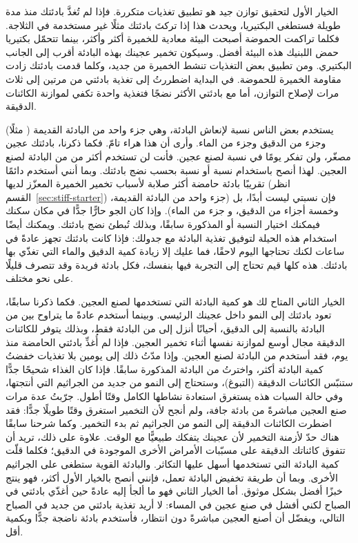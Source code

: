 الخيار الأول لتحقيق توازن جيد هو تطبيق تغذيات متكررة. فإذا لم تُغذَّ بادئتك منذ مدة طويلة فستطغى البكتيريا، ويحدث هذا إذا تركتَ بادئتك مثلًا غير مستخدمة في الثلاجة. فكلما تراكمت الحموضة أصبحت البيئة معادية للخميرة أكثر وأكثر، بينما تتحمّل بكتيريا حمض اللبنيك هذه البيئة أفضل. وسيكون تخمير عجينك بهذه البادئة أقرب إلى الجانب البكتيري. ومن تطبيق بعض التغذيات تنشط الخميرة من جديد، وكلما قدمت بادئتك زادت مقاومة الخميرة للحموضة. في البداية اضطررتُ إلى تغذية بادئتي من مرتين إلى ثلاث مرات  لإصلاح التوازن، أما مع بادئتي الأكثر نضجًا فتغذية واحدة تكفي لموازنة الكائنات الدقيقة.

يستخدم بعض الناس نسبة  لإنعاش البادئة، وهي جزء واحد من البادئة القديمة ( مثلًا) وجزء من الدقيق وجزء من الماء. وأرى أن هذا هراء تامّ. فكما ذكرنا، بادئتك عجين مصغّر، ولن تفكر يومًا في نسبة  لصنع عجين. فأنت لن تستخدم أكثر من  من البادئة لصنع العجين. لهذا أنصح باستخدام نسبة  أو نسبة  بحسب نضج بادئتك. وبما أنني أستخدم دائمًا تقريبًا بادئة حامضة أكثر صلابة لأسباب تخمير الخميرة المعزّز لديها (انظر القسم~\ref{sec:stiff-starter}) فإن نسبتي ليست  أبدًا، بل  (جزء واحد من البادئة القديمة، وخمسة أجزاء من الدقيق، و جزء من الماء). وإذا كان الجو حارًّا جدًّا في مكان سكنك فيمكنك اختيار النسبة  أو  المذكورة سابقًا، وبذلك تُبطئ نضج بادئتك. ويمكنك أيضًا استخدام هذه الحيلة لتوفيق تغذية البادئة مع جدولك: فإذا كانت بادئتك تجهز عادةً في  ساعات لكنك تحتاجها اليوم لاحقًا، فما عليك إلا زيادة كمية الدقيق والماء التي تغذّي بها بادئتك. هذه كلها قيم تحتاج إلى التجربة فيها بنفسك، فكل بادئة فريدة وقد تتصرف قليلًا على نحو مختلف.

الخيار الثاني المتاح لك هو كمية البادئة التي تستخدمها لصنع العجين. فكما ذكرنا سابقًا، تعود بادئتك إلى النمو داخل عجينك الرئيسي. وبينما أستخدم عادةً ما يتراوح بين  من البادئة بالنسبة إلى الدقيق، أحيانًا أنزل إلى  من البادئة فقط، وبذلك يتوفر للكائنات الدقيقة مجال أوسع لموازنة نفسها أثناء تخمير العجين. فإذا لم أُغذِّ بادئتي الحامضة منذ يوم، فقد أستخدم  من البادئة لصنع العجين. وإذا مدّتُ ذلك إلى يومين بلا تغذيات خفضتُ كمية البادئة أكثر، واخترتُ  من البادئة المذكورة سابقًا. فإذا كان الغذاء شحيحًا جدًّا ستنبّس الكائنات الدقيقة (التبوغ)، وستحتاج إلى النمو من جديد من الجراثيم التي أنتجتها، وفي حالة السبات هذه يستغرق استعادة نشاطها الكامل وقتًا أطول. جرّبتُ عدة مرات صنع العجين مباشرةً من بادئة جافة، ولم أنجح لأن التخمير استغرق وقتًا طويلًا جدًّا: فقد اضطرت الكائنات الدقيقة إلى النمو من الجراثيم ثم بدء التخمير. وكما شرحنا سابقًا هناك حدّ لأزمنة التخمير لأن عجينك يتفكك طبيعيًّا مع الوقت. علاوة على ذلك، تريد أن تتفوق كائناتك الدقيقة على مسبّبات الأمراض الأخرى الموجودة في الدقيق؛ فكلما قلّت كمية البادئة التي تستخدمها أسهل عليها التكاثر. والبادئة القوية ستطغى على الجراثيم الأخرى. وبما أن طريقة تخفيض البادئة تعمل، فإنني أنصح بالخيار الأول أكثر، فهو ينتج خبزًا أفضل بشكل موثوق. أما الخيار الثاني فهو ما ألجأ إليه عادةً حين أغذّي بادئتي في الصباح لكني أفشل في صنع عجين في المساء: لا أريد تغذية بادئتي من جديد في الصباح التالي، ويفضّل أن أصنع العجين مباشرةً دون انتظار، فأستخدم بادئة ناضجة جدًّا وبكمية أقل.

